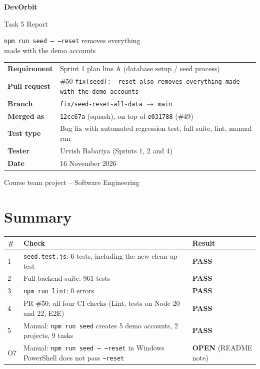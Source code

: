 \documentclass[11pt,a4paper]{article}
\newcommand{\PASS}{\textbf{\textcolor{passgreen}{PASS}}}
\newcommand{\OPEN}{\textbf{\textcolor{pendorange}{OPEN}}}
\begin{document}
\begin{titlepage}\centering\vspace*{2.5cm}
{\Huge\bfseries\color{accent} DevOrbit\par}\vspace{0.6cm}
{\LARGE Task 5 Report\par}\vspace{0.3cm}
{\Large \texttt{npm run seed -- --reset} removes everything\\made with the demo accounts\par}\vspace{1.5cm}
\begin{tabular}{>{\bfseries}l l}
Requirement  & Sprint 1 plan line A (database setup / seed process) \\
Pull request & \#50 \texttt{fix(seed): --reset also removes everything made with the demo accounts} \\
Branch       & \texttt{fix/seed-reset-all-data} $\rightarrow$ \texttt{main} \\
Merged as    & \texttt{12cc67a} (squash), on top of \texttt{e031788} (\#49) \\
Test type    & Bug fix with automated regression test, full suite, lint, manual run \\
Tester       & Urvish Babariya (Sprints 1, 2 and 4) \\
Date         & 16 November 2026 \\
\end{tabular}\vfill{\small Course team project -- Software Engineering\par}
\end{titlepage}
\tableofcontents\newpage

\section{Summary}
\begin{center}
\begin{tabularx}{\linewidth}{l X l}\toprule
\textbf{\#} & \textbf{Check} & \textbf{Result}\\\midrule
1 & \texttt{seed.test.js}: 6 tests, including the new clean-up test & \PASS\\
2 & Full backend suite: 961 tests & \PASS\\
3 & \texttt{npm run lint}: 0 errors & \PASS\\
4 & PR \#50: all four CI checks (Lint, tests on Node 20 and 22, E2E) & \PASS\\
5 & Manual: \texttt{npm run seed} creates 5 demo accounts, 2 projects, 9 tasks & \PASS\\
O7 & Manual: \texttt{npm run seed -- --reset} in Windows PowerShell does not pass \texttt{--reset} & \OPEN{} (README note)\\
\bottomrule\end{tabularx}\end{center}
\end{document}
